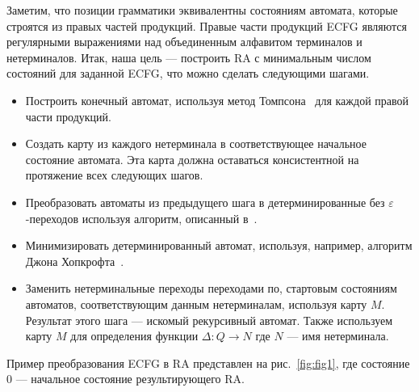 \documentclass[14pt]{matmex-diploma-custom}
\begin{document}
	Заметим, что позиции грамматики эквивалентны состояниям автомата, которые 
	строятся из правых частей продукций. Правые части продукций ECFG являются регулярными
	выражениями над объединенным алфавитом терминалов и нетерминалов. Итак, наша цель ---
	построить RA с минимальным числом состояний для заданной ECFG, что можно сделать следующими шагами.
	\begin{itemize}
		\item Построить конечный автомат, используя метод Томпсона~\cite{Thompson:1968:PTR:363347.363387} для каждой правой
		части продукций.
		\item Создать карту из каждого нетерминала в соответствующее начальное состояние автомата.
		Эта карта должна оставаться консистентной на протяжение всех следующих шагов.
		\item Преобразовать автоматы из предыдущего шага в детерминированные без 
		$\varepsilon$-переходов используя алгоритм, описанный в~\cite{aho1974design}.
		\item Минимизировать детерминированный автомат, используя, например, алгоритм
		Джона Хопкрофта~\cite{hopcroft1971n}.
		\item Заменить нетерминальные переходы переходами по, стартовым состояниям автоматов,
		соответствующим данным нетерминалам, используя карту $M$. Результат 
		этого шага --- искомый рекурсивный автомат. Также используем карту $M$
		для определения функции $\Delta : Q \to N$ где $N$ --- имя нетерминала.
	\end{itemize}
	Пример преобразования ECFG в RA представлен на рис.~\ref{fig:fig1}, где состояние
	0 --- начальное состояние результирующего RA.
\end{document}
